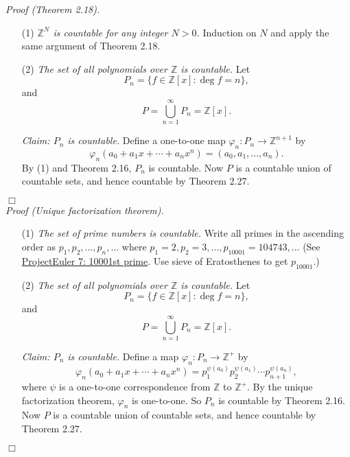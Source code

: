 \documentclass{article}
\begin{document}
\emph{Proof (Theorem 2.18).}
\begin{enumerate}
\item[(1)]
\emph{$\mathbb{Z}^N$ is countable for any integer $N > 0$.}
Induction on $N$ and apply the same argument of Theorem 2.18.
\item[(2)]
\emph{The set of all polynomials over $\mathbb{Z}$ is countable.}
Let
$$P_n = \{ f \in \mathbb{Z}[x] : \deg f = n \},$$
and
$$P = \bigcup_{n = 1}^{\infty} P_n = \mathbb{Z}[x].$$

\emph{Claim: $P_n$ is countable.}
Define a one-to-one map $\varphi_n: P_n \rightarrow \mathbb{Z}^{n+1}$ by
$$\varphi_n(a_0 + a_1 x + \cdots + a_n x^n)
= (a_0, a_1, ..., a_n).$$
By (1) and Theorem 2.16, $P_n$ is countable.
Now $P$ is a countable union of countable sets,
and hence countable by Theorem 2.27.
\end{enumerate}
$\Box$ \\

\emph{Proof (Unique factorization theorem).}
\begin{enumerate}
\item[(1)]
\emph{The set of prime numbers is countable.}
Write all primes in the ascending order as $p_1, p_2, ..., p_n, ...$
where $p_1 = 2, p_2 = 3, ..., p_{10001} = 104743, ...$
(See \href{https://projecteuler.net/problem=7}{ProjectEuler 7: 10001st prime}.
Use sieve of Eratosthenes to get $p_{10001}$.)
\item[(2)]
\emph{The set of all polynomials over $\mathbb{Z}$ is countable.}
Let
$$P_n = \{ f \in \mathbb{Z}[x] : \deg f = n \},$$
and
$$P = \bigcup_{n = 1}^{\infty} P_n = \mathbb{Z}[x].$$

\emph{Claim: $P_n$ is countable.}
Define a map $\varphi_n: P_n \rightarrow \mathbb{Z}^+$ by
$$\varphi_n(a_0 + a_1 x + \cdots + a_n x^n)
= p_1^{\psi(a_0)} p_2^{\psi(a_1)} \cdots p_{n+1}^{\psi(a_n)},$$
where $\psi$ is a one-to-one correspondence from $\mathbb{Z}$ to $\mathbb{Z}^+$.
By the unique factorization theorem, $\varphi_n$ is one-to-one.
So $P_n$ is countable by Theorem 2.16.
Now $P$ is a countable union of countable sets,
and hence countable by Theorem 2.27.
\end{enumerate}
$\Box$ \\\\
\end{document}
